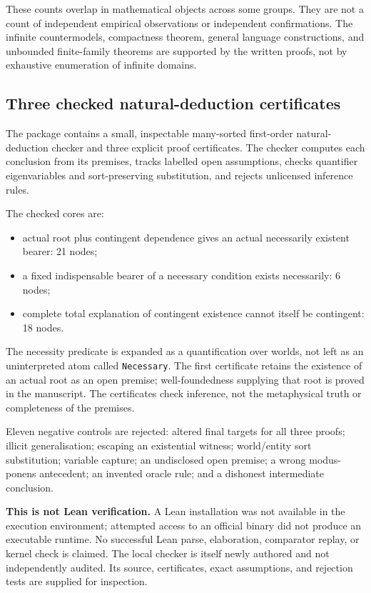 \documentclass[11pt,a4paper]{article}
\providecommand{\tightlist}{\setlength{\itemsep}{0pt}\setlength{\parskip}{0pt}}
\begin{document}
These counts overlap in mathematical objects across some groups. They
are not a count of independent empirical observations or independent
confirmations. The infinite countermodels, compactness theorem, general
language constructions, and unbounded finite-family theorems are
supported by the written proofs, not by exhaustive enumeration of
infinite domains.

\subsection*{Three checked natural-deduction
certificates}\label{three-checked-natural-deduction-certificates}

The package contains a small, inspectable many-sorted first-order
natural-deduction checker and three explicit proof certificates. The
checker computes each conclusion from its premises, tracks labelled open
assumptions, checks quantifier eigenvariables and sort-preserving
substitution, and rejects unlicensed inference rules.

The checked cores are:

\begin{itemize}
\tightlist
\item
  actual root plus contingent dependence gives an actual necessarily
  existent bearer: 21 nodes;
\item
  a fixed indispensable bearer of a necessary condition exists
  necessarily: 6 nodes;
\item
  complete total explanation of contingent existence cannot itself be
  contingent: 18 nodes.
\end{itemize}

The necessity predicate is expanded as a quantification over worlds, not
left as an uninterpreted atom called \texttt{Necessary}. The first
certificate retains the existence of an actual root as an open premise;
well-foundedness supplying that root is proved in the manuscript. The
certificates check inference, not the metaphysical truth or completeness
of the premises.

Eleven negative controls are rejected: altered final targets for all
three proofs; illicit generalisation; escaping an existential witness;
world/entity sort substitution; variable capture; an undisclosed open
premise; a wrong modus-ponens antecedent; an invented oracle rule; and a
dishonest intermediate conclusion.

\textbf{This is not Lean verification.} A Lean installation was not
available in the execution environment; attempted access to an official
binary did not produce an executable runtime. No successful Lean parse,
elaboration, comparator replay, or kernel check is claimed. The local
checker is itself newly authored and not independently audited. Its
source, certificates, exact assumptions, and rejection tests are
supplied for inspection.
\end{document}
